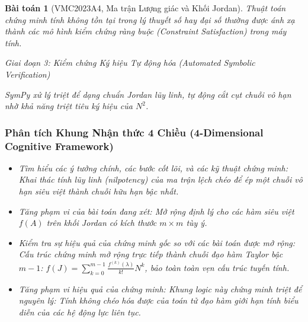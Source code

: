 \documentclass{article}
\newtheorem{baitoan}{Bài toán}
\begin{document}
\begin{baitoan}[VMC2023A4, Ma trận Lượng giác và Khối Jordan]
 Thuật toán chứng minh tính không tồn tại trong lý thuyết số hay đại số thường được ánh xạ thành các mô hình kiểm chứng ràng buộc (Constraint Satisfaction) trong máy tính.



\vspace{0.5em}\noindent\emph{Giai đoạn 3: Kiểm chứng Ký hiệu Tự động hóa (Automated Symbolic Verification)}
 
 \textsf{SymPy} xử lý triệt để dạng chuẩn Jordan lũy linh, tự động cắt cụt chuỗi vô hạn nhờ khả năng triệt tiêu ký hiệu của $N^2$.



 \subsubsection*{Phân tích Khung Nhận thức 4 Chiều (4-Dimensional Cognitive Framework)}
 \begin{itemize}
 \item \textit{Tìm hiểu các ý tưởng chính, các bước cốt lõi, và các kỹ thuật chứng minh}: Khai thác tính lũy linh (nilpotency) của ma trận lệch chéo để ép một chuỗi vô hạn siêu việt thành chuỗi hữu hạn bậc nhất.
 \item \textit{Tăng phạm vi của bài toán đang xét}: Mở rộng định lý cho các hàm siêu việt $f(A)$ trên khối Jordan có kích thước $m \times m$ tùy ý.
 \item \textit{Kiểm tra sự hiệu quả của chứng minh gốc so với các bài toán được mở rộng}: Cấu trúc chứng minh mở rộng trực tiếp thành chuỗi đạo hàm Taylor bậc $m-1$: $f(J) = \sum_{k=0}^{m-1} \frac{f^{(k)}(\lambda)}{k!} N^k$, bảo toàn toàn vẹn cấu trúc tuyến tính.
 \item \textit{Tăng phạm vi hiệu quả của chứng minh}: Khung logic này chứng minh triệt để nguyên lý: Tính không chéo hóa được của toán tử đạo hàm giới hạn tính biểu diễn của các hệ động lực liên tục.
 \end{itemize}
\end{baitoan}

\end{document}
